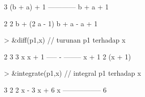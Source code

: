 \documentclass{report}
\begin{document}
\begin{eulernotebook}
\begin{eulercomment}
\begin{eulercomment}
\begin{euleroutput}
                                      3
                               (b + a)  + 1
                               ------------
                                b + a + 1
  
  
                       2                  2
                      b  + (2 a - 1) b + a  - a + 1
  
\end{euleroutput}
\begin{eulerprompt}
> &diff(p1,x) // turunan p1 terhadap x
\end{eulerprompt}
\begin{euleroutput}
  
                                2      3
                             3 x      x  + 1
                             ----- - --------
                             x + 1          2
                                     (x + 1)
  
\end{euleroutput}
\begin{eulerprompt}
> &integrate(p1,x) // integral p1 terhadap x 
\end{eulerprompt}
\begin{euleroutput}
  
                               3      2
                            2 x  - 3 x  + 6 x
                            -----------------
                                    6
  

\end{euleroutput}
\end{eulercomment}
\end{eulercomment}
\end{eulernotebook}
\end{document}
